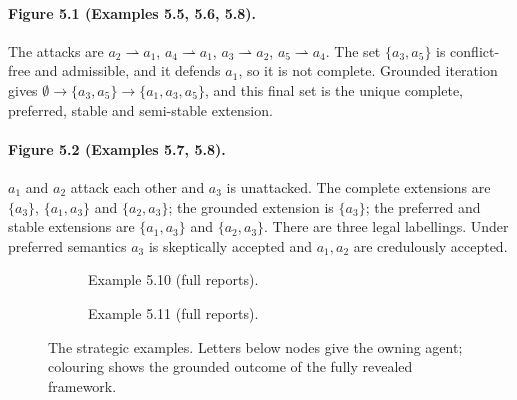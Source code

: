 \documentclass[11pt,a4paper]{article}
\newcommand{\attacks}{\rightharpoonup}
\begin{document}
\paragraph{Figure 5.1 (Examples 5.5, 5.6, 5.8).}
The attacks are $a_2\attacks a_1$, $a_4\attacks a_1$, $a_3\attacks a_2$, $a_5\attacks a_4$. The set $\{a_3,a_5\}$ is conflict-free and admissible, and it defends $a_1$, so it is not complete. Grounded iteration gives $\emptyset\to\{a_3,a_5\}\to\{a_1,a_3,a_5\}$, and this final set is the unique complete, preferred, stable and semi-stable extension.

\paragraph{Figure 5.2 (Examples 5.7, 5.8).}
$a_1$ and $a_2$ attack each other and $a_3$ is unattacked. The complete extensions are $\{a_3\}$, $\{a_1,a_3\}$ and $\{a_2,a_3\}$; the grounded extension is $\{a_3\}$; the preferred and stable extensions are $\{a_1,a_3\}$ and $\{a_2,a_3\}$. There are three legal labellings. Under preferred semantics $a_3$ is skeptically accepted and $a_1,a_2$ are credulously accepted.

\begin{figure}[H]
\centering
\begin{subfigure}[t]{0.48\textwidth}
\centering
{}
\caption{Example 5.10 (full reports).}
\end{subfigure}\hfill
\begin{subfigure}[t]{0.48\textwidth}
\centering
{}
\caption{Example 5.11 (full reports).}
\end{subfigure}
\caption{The strategic examples. Letters below nodes give the owning agent; colouring shows the grounded outcome of the fully revealed framework.}
\label{fig:book-strategic}
\end{figure}
\end{document}
